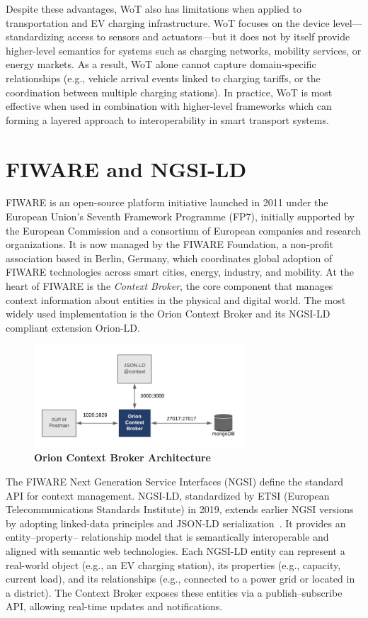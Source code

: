 Despite these advantages, WoT also has limitations when applied to
transportation and EV charging infrastructure. WoT focuses on the
device level—standardizing access to sensors and actuators—but it
does not by itself provide higher-level semantics for systems such as
charging networks, mobility services, or energy markets. As a result,
WoT alone cannot capture domain-specific relationships (e.g., vehicle
arrival events linked to charging tariffs, or the coordination between
multiple charging stations). In practice, WoT is most effective when
used in combination with higher-level frameworks which can
forming a layered approach to interoperability in smart transport
systems.

\section{FIWARE and NGSI-LD}

FIWARE is an open-source platform initiative launched in 2011 under
the European Union’s Seventh Framework Programme (FP7), initially
supported by the European Commission and a consortium of European
companies and research organizations. It is now managed by the
FIWARE Foundation, a non-profit association based in Berlin, Germany,
which coordinates global adoption of FIWARE technologies across smart
cities, energy, industry, and mobility. At the heart of FIWARE is the
\emph{Context Broker}, the core component that manages context
information about entities in the physical and digital world. The most
widely used implementation is the Orion Context Broker and its
NGSI-LD compliant extension Orion-LD.

\begin{figure}[ht]
    \centering
    \includegraphics[width=0.7\textwidth]{Images/orion.png}
    \caption{\textbf{Orion Context Broker Architecture}}
    \label{fig:orion}
\end{figure}

The FIWARE Next Generation Service Interfaces (NGSI) define the
standard API for context management. NGSI-LD, standardized by ETSI
(European Telecommunications Standards Institute) in 2019, extends
earlier NGSI versions by adopting linked-data principles and JSON-LD
serialization~\cite{ETSI2019NGSILD}. It provides an entity–property–
relationship model that is semantically interoperable and aligned with
semantic web technologies. Each NGSI-LD entity can represent a
real-world object (e.g., an EV charging station), its properties (e.g.,
capacity, current load), and its relationships (e.g., connected to a power
grid or located in a district). The Context Broker exposes these entities
via a publish–subscribe API, allowing real-time updates and
notifications.

